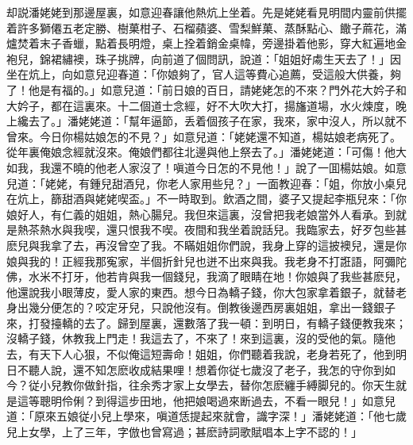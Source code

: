 却説潘姥姥到那邊屋裏，如意迎春讓他熱炕上坐着。先是姥姥看見明間内靈前供擺着許多獅僊五老定勝、樹菓柑子、石榴蘋婆、雪梨鮮菓、蒸酥點心、饊子蔴花，滿爐焚着末子香蠟，點着長明燈，桌上拴着銷金桌幃，旁邊掛着他影，穿大紅遍地金袍兒，錦裙繡襖，珠子挑牌，向前道了個問訊，說道：「姐姐好䖏生天去了！」因坐在炕上，向如意兒迎春道：「你娘夠了，官人這等費心追薦，受這般大供養，夠了！他是有福的。」如意兒道：「前日娘的百日，請姥姥怎的不來？門外花大妗子和大妗子，都在這裏來。十二個道士念經，好不大吹大打，揚旛道場，水火煉度，晚上纔去了。」潘姥姥道：「幫年逼節，丢着個孩子在家，我來，家中沒人，所以就不曾來。今日你楊姑娘怎的不見？」如意兒道：「姥姥還不知道，楊姑娘老病死了。從年裏俺娘念經就沒來。俺娘們都往北邊與他上祭去了。」潘姥姥道：「可傷！他大如我，我還不曉的他老人家沒了！嗔道今日怎的不見他！」說了一囬楊姑娘。如意兒道：「姥姥，有鍾兒甜酒兒，你老人家用些兒？」一面教迎春：「姐，你放小桌兒在炕上，篩甜酒與姥姥喫盃。」不一時取到。飲酒之間，婆子又提起李瓶兒來：「你娘好人，有仁義的姐姐，熱心腸兒。我但來這裏，沒曾把我老娘當外人看承。到就是熱茶熱水與我喫，還只恨我不喫。夜間和我坐着說話兒。我臨家去，好歹包些甚麽兒與我拿了去，再沒曾空了我。不瞞姐姐你們說，我身上穿的這披襖兒，還是你娘與我的！正經我那寃家，半個折針兒也迸不出來與我。我老身不打誑語，阿彌陀佛，水米不打牙，他若肯與我一個錢兒，我滴了眼睛在地！你娘與了我些甚麽兒，他還說我小眼薄皮，愛人家的東西。想今日為轎子錢，你大包家拿着銀子，就替老身出幾分便怎的？咬定牙兒，只說他沒有。倒教後邊西房裏姐姐，拿出一錢銀子來，打發擡轎的去了。歸到屋裏，還數落了我一頓：到明日，有轎子錢便教我來；沒轎子錢，休教我上門走！我這去了，不來了！來到這裏，沒的受他的氣。隨他去，有天下人心狠，不似俺這短壽命！姐姐，你們聽着我說，老身若死了，他到明日不聽人說，還不知怎麽收成結果哩！想着你従七歲沒了老子，我怎的守你到如今？従小兒教你做針指，往余秀才家上女學去，替你怎麽纏手縛脚兒的。你天生就是這等聰明伶俐？到得這步田地，他把娘喝過來断過去，不看一眼兒！」如意兒道：「原來五娘従小兒上學來，嗔道恁提起來就會，識字深！」潘姥姥道：「他七歲兒上女學，上了三年，字倣也曾寫過；甚麽詩詞歌賦唱本上字不認的！」

